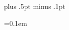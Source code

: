%




\def\nbhy{‑}


\def\nbsp{ }
\def\zwsp{​}
\def\wj{⁠}


\baselineskip=12.5pt plus .5pt minus .1pt

\def\qfkern{\kern1pt}
\def\pfkern{\kern1pt}
\def\sp{\kern3pt}
\def\thnsp{\kern1pt}
\def\thnnsp{\kern0.5pt}
\def\nsp{\kern-3pt}
\def\nthnsp{\kern-1pt}
\def\nthnnsp{\kern-0.5pt}
\quotekernamount=0.1em

\def\b{\vskip 0.5\baselineskip}


\def\suckupline{\vskip -\baselineskip}
\def\suckuphalfline{\vskip -0.5\baselineskip}
\def\suckupqline{\vskip -0.25\baselineskip}
\def\suckupqqline{\vskip -0.125\baselineskip}
\def\skipline{\vskip\baselineskip}
\def\skiphalfline{\vskip 0.5\baselineskip}
\def\skipqline{\vskip 0.25\baselineskip}
\def\skipqqline{\vskip 0.125\baselineskip}


